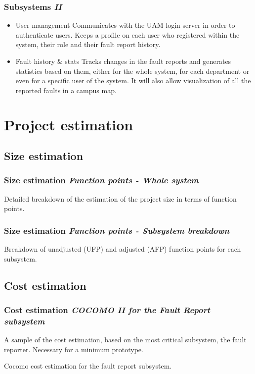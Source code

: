 \documentclass[10pt, compress,usetitleprogressbar,aspectratio=1610]{beamer}
\begin{document}
\begin{frame}
\frametitle{Subsystems \hfill \emph{II}}
\begin{itemize}
\item \alert{User management} Communicates with the UAM login server in order to authenticate users. Keeps a profile on each user who registered within the system, their role and their fault report history.
\item \alert{Fault history \& stats} Tracks changes in the fault reports and generates statistics based on them, either for the whole system, for each department or even for a specific user of the system. It will also allow visualization of all the reported faults in a campus map.
\end{itemize}
\end{frame}

\section{Project estimation}

\subsection{Size estimation}
\begin{frame}
\frametitle{Size estimation \hfill \emph{Function points - Whole system}}
\begin{table}[hbtp]
\centering

\caption{Detailed breakdown of the estimation of the project size in terms of function points.}
\label{tblFunctionPointsSize}
\end{table}
\end{frame}

\begin{frame}
\frametitle{Size estimation \hfill \emph{Function points - Subsystem breakdown}}
\begin{table}[hbtp]
\centering

\caption{Breakdown of unadjusted (UFP) and adjusted (AFP) function points for each subsystem.}
\end{table}
\end{frame}

\subsection{Cost estimation}
\begin{frame}
\frametitle{Cost estimation \hfill \emph{COCOMO II for the Fault Report subsystem}}
A sample of the cost estimation, based on the most critical subsystem, the fault reporter. Necessary for a minimum prototype.

\begin{table}[hbtp]
\centering

\caption{Cocomo cost estimation for the fault report subsystem.}
\label{tblFaultReportCost}
\end{table}
\end{frame}
\end{document}
